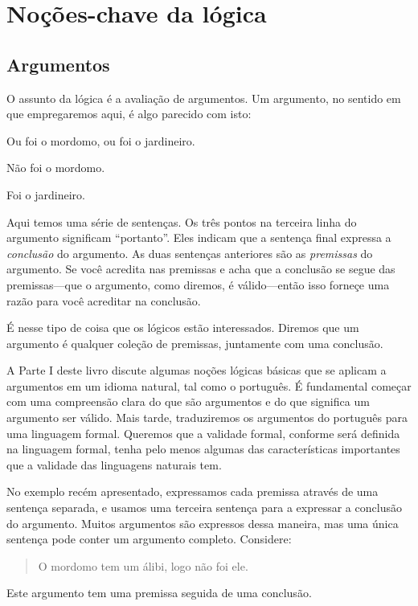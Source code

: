 \part{Noções-chave da lógica}
\label{ch.intro}


\chapter{Argumentos}
\label{s:Arguments}

O assunto da lógica é a avaliação de argumentos.  Um argumento, no sentido em que empregaremos aqui, é algo parecido com isto:

	\begin{earg}\label{argButlerGardner}
		\item[] Ou foi o mordomo, ou foi o jardineiro.
		\item[] Não foi o mordomo.
		\item[\therefore] Foi o jardineiro.
	\end{earg}
Aqui temos uma série de sentenças.
Os três pontos na terceira linha do argumento significam ``portanto''.
Eles indicam que a sentença final expressa a \emph{conclusão} do argumento.
As duas sentenças anteriores são as \emph{premissas} do argumento.
Se você acredita nas premissas e acha que a conclusão se segue das premissas---que o argumento, como diremos, é válido---então isso forneçe uma razão para você acreditar na conclusão.

É nesse tipo de coisa que os lógicos estão interessados. Diremos que um argumento é qualquer coleção de premissas, juntamente com uma conclusão.

A Parte I deste livro discute algumas noções lógicas básicas que se aplicam a argumentos em um idioma natural, tal como o português.
É fundamental começar com uma compreensão clara do que são argumentos e do que significa um argumento ser válido.
Mais tarde, traduziremos os argumentos do português para uma linguagem formal. Queremos que a validade formal, conforme será definida na linguagem formal, tenha pelo menos algumas das características importantes que a validade das linguagens naturais tem.

No exemplo recém apresentado, expressamos cada premissa através de uma sentença separada, e usamos uma terceira sentença para a expressar a conclusão do argumento.
Muitos argumentos são expressos dessa maneira, mas uma única sentença pode conter um argumento completo.
Considere:
	\begin{quote}
		O mordomo tem um álibi, logo não foi ele.
	\end{quote}
Este argumento tem uma premissa seguida de uma conclusão.

